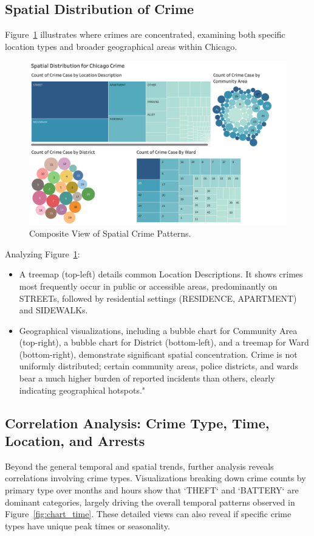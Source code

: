 \documentclass[11pt]{article}
\begin{document}
\subsection{Spatial Distribution of Crime}
\label{subsec:spatial_distribution}
Figure~\ref{fig:chart_space} illustrates where crimes are concentrated, examining both specific location types and broader geographical areas within Chicago.

\begin{figure}[htbp]
    \centering
    \includegraphics[width=\textwidth]{chart_space.png}
    \caption{Composite View of Spatial Crime Patterns.}
    \label{fig:chart_space}
\end{figure}

Analyzing Figure~\ref{fig:chart_space}:
\begin{itemize}
    \item A treemap (top-left) details common Location Descriptions. It shows crimes most frequently occur in public or accessible areas, predominantly on STREETs, followed by residential settings (RESIDENCE, APARTMENT) and SIDEWALKs.
    \item Geographical visualizations, including a bubble chart for Community Area (top-right), a bubble chart for District (bottom-left), and a treemap for Ward (bottom-right), demonstrate significant spatial concentration. Crime is not uniformly distributed; certain community areas, police districts, and wards bear a much higher burden of reported incidents than others, clearly indicating geographical hotspots."
\end{itemize}

\subsection{Correlation Analysis: Crime Type, Time, Location, and Arrests}
\label{subsec:correlation_analysis}
Beyond the general temporal and spatial trends, further analysis reveals correlations involving crime types. Visualizations breaking down crime counts by primary type over months and hours show that `THEFT` and `BATTERY` are dominant categories, largely driving the overall temporal patterns observed in Figure~\ref{fig:chart_time}. These detailed views can also reveal if specific crime types have unique peak times or seasonality.
\end{document}
